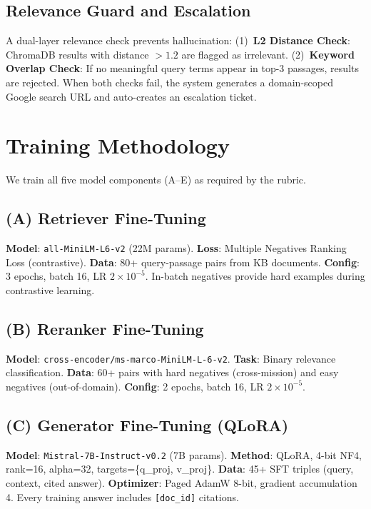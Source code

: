 \documentclass{article}
\begin{document}
\subsection{Relevance Guard and Escalation}

A dual-layer relevance check prevents hallucination:
(1)~\textbf{L2 Distance Check}: ChromaDB results with distance $> 1.2$ are flagged as irrelevant.
(2)~\textbf{Keyword Overlap Check}: If no meaningful query terms appear in top-3 passages, results are rejected.
When both checks fail, the system generates a domain-scoped Google search URL and auto-creates an escalation ticket.

\section{Training Methodology}

We train all five model components (A--E) as required by the rubric.

\subsection{(A) Retriever Fine-Tuning}
\textbf{Model}: \texttt{all-MiniLM-L6-v2} (22M params).
\textbf{Loss}: Multiple Negatives Ranking Loss (contrastive).
\textbf{Data}: 80+ query-passage pairs from KB documents.
\textbf{Config}: 3 epochs, batch 16, LR $2{\times}10^{-5}$.
In-batch negatives provide hard examples during contrastive learning.

\subsection{(B) Reranker Fine-Tuning}
\textbf{Model}: \texttt{cross-encoder/ms-marco-MiniLM-L-6-v2}.
\textbf{Task}: Binary relevance classification.
\textbf{Data}: 60+ pairs with hard negatives (cross-mission) and easy negatives (out-of-domain).
\textbf{Config}: 2 epochs, batch 16, LR $2{\times}10^{-5}$.

\subsection{(C) Generator Fine-Tuning (QLoRA)}
\textbf{Model}: \texttt{Mistral-7B-Instruct-v0.2} (7B params).
\textbf{Method}: QLoRA, 4-bit NF4, rank=16, alpha=32, targets=\{q\_proj, v\_proj\}.
\textbf{Data}: 45+ SFT triples (query, context, cited answer).
\textbf{Optimizer}: Paged AdamW 8-bit, gradient accumulation 4.
Every training answer includes \texttt{[doc\_id]} citations.
\end{document}
